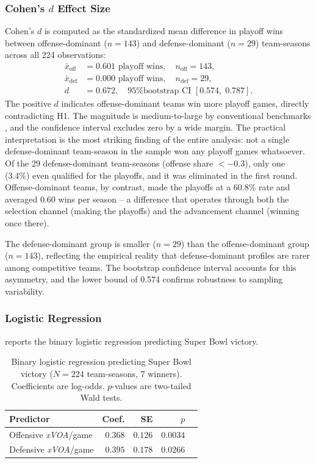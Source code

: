\documentclass[12pt,a4paper]{article}
\newcommand{\xvoa}{\textit{xVOA}}
\begin{document}
\subsubsection{Cohen's $d$ Effect Size}

Cohen's $d$ is computed as the standardized mean difference in playoff wins between offense-dominant ($n = 143$) and defense-dominant ($n = 29$) team-seasons across all 224 observations:
\begin{align*}
  \bar{x}_{\mathrm{off}} &= 0.601 \text{ playoff wins}, \quad n_{\mathrm{off}} = 143, \\
  \bar{x}_{\mathrm{def}} &= 0.000 \text{ playoff wins}, \quad n_{\mathrm{def}} = 29, \\
  d &= 0.672, \quad \text{95\% bootstrap CI } [0.574,\; 0.787].
\end{align*}
The positive $d$ indicates offense-dominant teams win more playoff games, directly contradicting H1. The magnitude is medium-to-large by conventional benchmarks \citep{cohen1988statisticalpower}, and the confidence interval excludes zero by a wide margin. The practical interpretation is the most striking finding of the entire analysis: not a single defense-dominant team-season in the sample won any playoff games whatsoever. Of the 29 defense-dominant team-seasons (offense share $< -0.3$), only one (3.4\%) even qualified for the playoffs, and it was eliminated in the first round. Offense-dominant teams, by contrast, made the playoffs at a 60.8\% rate and averaged 0.60 wins per season -- a difference that operates through both the selection channel (making the playoffs) and the advancement channel (winning once there).

The defense-dominant group is smaller ($n = 29$) than the offense-dominant group ($n = 143$), reflecting the empirical reality that defense-dominant profiles are rarer among competitive teams. The bootstrap confidence interval accounts for this asymmetry, and the lower bound of 0.574 confirms robustness to sampling variability.

\subsubsection{Logistic Regression}

 reports the binary logistic regression predicting Super Bowl victory.

\begin{table}[htbp]
  \centering
  \caption{Binary logistic regression predicting Super Bowl victory
           ($N = 224$ team-seasons, 7 winners). Coefficients are
           log-odds. $p$-values are two-tailed Wald tests.}
  \label{tab:logistic}
  \begin{tabular}{lrrrr}
    \toprule
    \textbf{Predictor} & \textbf{Coef.}
      & \textbf{SE}
      & \textbf{$p$} \\
    \midrule
    Offensive \xvoa{}/game & $0.368$ & $0.126$ & $0.0034$ \\
    Defensive \xvoa{}/game & $0.395$ & $0.178$ & $0.0266$ \\
    \bottomrule
  \end{tabular}
\end{table}
\end{document}
